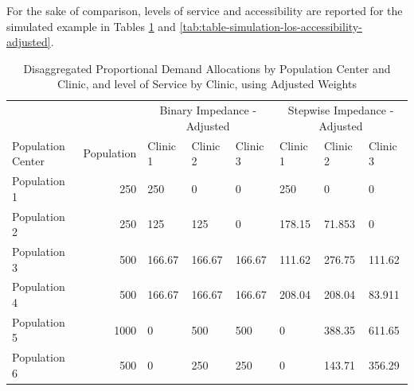 \documentclass[10pt,letterpaper]{article}
\begin{document}
For the sake of comparison, levels of service and accessibility are
reported for the simulated example in Tables
\ref{tab:table-simulation-demand-adjusted} and
\ref{tab:table-simulation-los-accessibility-adjusted}.

\begin{landscape}\begin{table}[t]

\caption{\label{tab:table-simulation-demand-adjusted}\label{tab:table-simulation-demand-adjusted}Disaggregated Proportional Demand Allocations by Population Center and Clinic, and level of Service by Clinic, using Adjusted Weights}
\centering
\fontsize{7}{9}\selectfont
\begin{tabular}{lrllllll}
\toprule
\multicolumn{2}{c}{ } & \multicolumn{3}{c}{Binary Impedance - Adjusted} & \multicolumn{3}{c}{Stepwise Impedance - Adjusted} \\
\cmidrule(l{2pt}r{2pt}){3-5} \cmidrule(l{2pt}r{2pt}){6-8}
Population Center & Population & Clinic 1 & Clinic 2 & Clinic 3 & Clinic 1 & Clinic 2 & Clinic 3\\
\midrule
Population 1 & 250 & \textcolor[HTML]{0D0887}{250} & \textcolor[HTML]{FCCE25}{0} & \textcolor[HTML]{FCCE25}{0} & \textcolor[HTML]{0D0887}{250} & \textcolor[HTML]{FCCE25}{0} & \textcolor[HTML]{FCCE25}{0}\\
Population 2 & 250 & \textcolor[HTML]{8505A7}{125} & \textcolor[HTML]{8505A7}{125} & \textcolor[HTML]{FCCE25}{0} & \textcolor[HTML]{0D0887}{178.15} & \textcolor[HTML]{D45270}{71.853} & \textcolor[HTML]{FCCE25}{0}\\
Population 3 & 500 & \textcolor[HTML]{E16462}{166.67} & \textcolor[HTML]{E16462}{166.67} & \textcolor[HTML]{E16462}{166.67} & \textcolor[HTML]{FCCE25}{111.62} & \textcolor[HTML]{0D0887}{276.75} & \textcolor[HTML]{FCCE25}{111.62}\\
Population 4 & 500 & \textcolor[HTML]{900DA4}{166.67} & \textcolor[HTML]{900DA4}{166.67} & \textcolor[HTML]{900DA4}{166.67} & \textcolor[HTML]{0D0887}{208.04} & \textcolor[HTML]{0D0887}{208.04} & \textcolor[HTML]{FCCE25}{83.911}\\
Population 5 & 1000 & \textcolor[HTML]{FCCE25}{0} & \textcolor[HTML]{5C01A6}{500} & \textcolor[HTML]{5C01A6}{500} & \textcolor[HTML]{FCCE25}{0} & \textcolor[HTML]{9A169F}{388.35} & \textcolor[HTML]{0D0887}{611.65}\\
\addlinespace
Population 6 & 500 & \textcolor[HTML]{FCCE25}{0} & \textcolor[HTML]{8505A7}{250} & \textcolor[HTML]{8505A7}{250} & \textcolor[HTML]{FCCE25}{0} & \textcolor[HTML]{D45270}{143.71} & \textcolor[HTML]{0D0887}{356.29}\\

\end{tabular}
\end{table}
\end{landscape}
\end{document}

